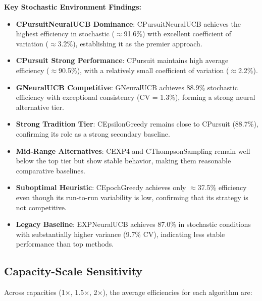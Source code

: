 \documentclass[12pt,a4paper]{article}
\newcommand{\stochastic}[1]{\textcolor{stochasticcolor}{\textbf{#1}}}
\newcommand{\critical}[1]{\textcolor{criticalcolor}{\textbf{#1}}}
\newcommand{\legacy}[1]{\textcolor{legacycolor}{\textbf{#1}}}
\newcommand{\neural}[1]{\textcolor{neuralcolor}{\textbf{#1}}}
\begin{document}
\begin{tcolorbox}[colback=stochasticcolor!10,colframe=stochasticcolor,title=\textbf{Stochastic Environment Deep Analysis (1$\times$–2$\times$ Capacities, T/Tb Combined)}]
\textbf{Key Stochastic Environment Findings:}
\begin{itemize}
\item \neural{CPursuitNeuralUCB Dominance}: CPursuitNeuralUCB achieves the highest efficiency in stochastic ($\approx$91.6\%) with excellent coefficient of variation ($\approx$3.2\%), establishing it as the premier approach.
\item \stochastic{CPursuit Strong Performance}: CPursuit maintains high average efficiency ($\approx$90.5\%), with a relatively small coefficient of variation ($\approx$2.2\%).
\item \neural{GNeuralUCB Competitive}: GNeuralUCB achieves 88.9\% stochastic efficiency with exceptional consistency (CV = 1.3\%), forming a strong neural alternative tier.
\item \stochastic{Strong Tradition Tier}: CEpsilonGreedy remains close to CPursuit (88.7\%), confirming its role as a strong secondary baseline.
\item \stochastic{Mid-Range Alternatives}: CEXP4 and CThompsonSampling remain well below the top tier but show stable behavior, making them reasonable comparative baselines.
\item \critical{Suboptimal Heuristic}: CEpochGreedy achieves only $\approx$37.5\% efficiency even though its run-to-run variability is low, confirming that its strategy is not competitive.
\item \legacy{Legacy Baseline}: EXPNeuralUCB achieves 87.0\% in stochastic conditions with substantially higher variance (9.7\% CV), indicating less stable performance than top methods.
\end{itemize}

\end{tcolorbox}

\subsection{Capacity-Scale Sensitivity}

Across capacities (1$\times$, 1.5$\times$, 2$\times$), the average efficiencies for each algorithm are:
\end{document}
